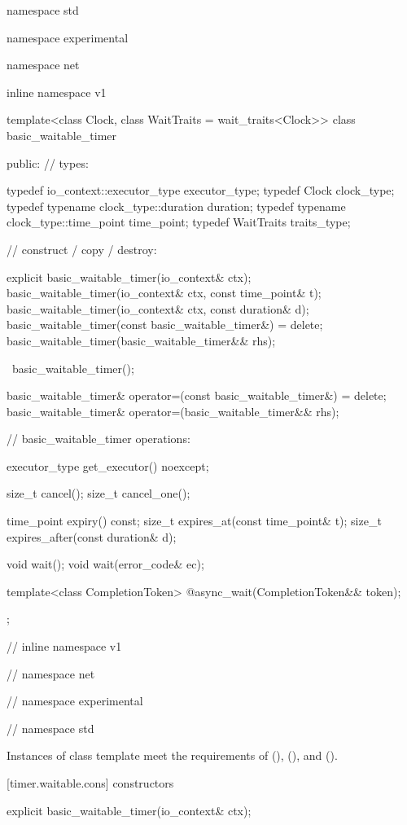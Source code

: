 \begin{codeblock}
namespace std {
namespace experimental {
namespace net {
inline namespace v1 {

  template<class Clock, class WaitTraits = wait_traits<Clock>>
  class basic_waitable_timer
  {
  public:
    // types:

    typedef io_context::executor_type executor_type;
    typedef Clock clock_type;
    typedef typename clock_type::duration duration;
    typedef typename clock_type::time_point time_point;
    typedef WaitTraits traits_type;

    // construct / copy / destroy:

    explicit basic_waitable_timer(io_context& ctx);
    basic_waitable_timer(io_context& ctx, const time_point& t);
    basic_waitable_timer(io_context& ctx, const duration& d);
    basic_waitable_timer(const basic_waitable_timer&) = delete;
    basic_waitable_timer(basic_waitable_timer&& rhs);

    ~basic_waitable_timer();

    basic_waitable_timer& operator=(const basic_waitable_timer&) = delete;
    basic_waitable_timer& operator=(basic_waitable_timer&& rhs);

    // basic_waitable_timer operations:

    executor_type get_executor() noexcept;

    size_t cancel();
    size_t cancel_one();

    time_point expiry() const;
    size_t expires_at(const time_point& t);
    size_t expires_after(const duration& d);

    void wait();
    void wait(error_code& ec);

    template<class CompletionToken>
      @\DEDUCED@ async_wait(CompletionToken&& token);
  };

} // inline namespace v1
} // namespace net
} // namespace experimental
} // namespace std
\end{codeblock}

\pnum
Instances of class template  meet the requirements of  (),  (), and  ().


[timer.waitable.cons]{ constructors}

\begin{itemdecl}
explicit basic_waitable_timer(io_context& ctx);
\end{itemdecl}

